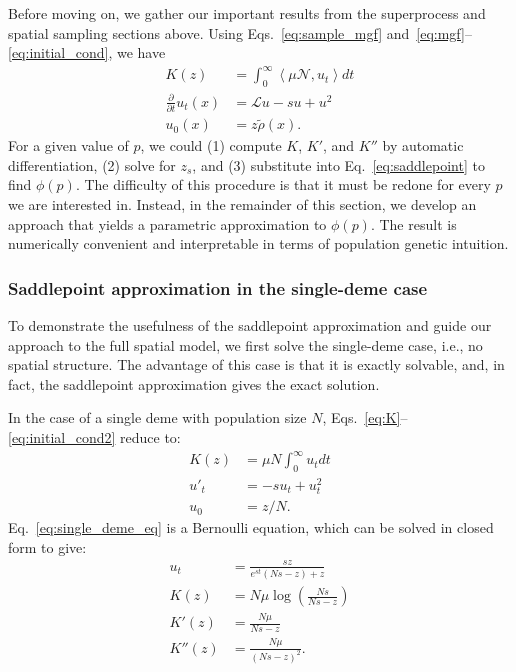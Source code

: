 \documentclass{article}
\begin{document}
Before moving on, we gather our important results from the superprocess and spatial sampling sections above.
Using Eqs.~\ref{eq:sample_mgf} and~\ref{eq:mgf}--\ref{eq:initial_cond}, we have
\begin{align}
    K(z) & = \int_0^\infty \left< \mu \mathcal{N}, u_t \right> dt \label{eq:k} \\
    \frac{\partial}{\partial t} u_t(x) & = \mathcal{L}u - su + u^2 \label{eq:pde2} \\
    u_0(x) & = z \tilde{\rho}(x). \label{eq:initial_cond2}
\end{align}
For a given value of $p$, we could (1) compute $K$, $K'$, and $K''$ by automatic differentiation, (2) solve for $z_s$, and (3) substitute into Eq.~\ref{eq:saddlepoint} to find $\phi(p)$.
The difficulty of this procedure is that it must be redone for every $p$ we are interested in.
Instead, in the remainder of this section, we develop an approach that yields a parametric approximation to $\phi(p)$.
The result is numerically convenient and interpretable in terms of population genetic intuition.

\subsubsection*{Saddlepoint approximation in the single-deme case}
To demonstrate the usefulness of the saddlepoint approximation and guide our approach to the full spatial model, we first solve the single-deme case, i.e., no spatial structure.
The advantage of this case is that it is exactly solvable, and, in fact, the saddlepoint approximation gives the exact solution.

In the case of a single deme with population size $N$, Eqs.~\ref{eq:K}--\ref{eq:initial_cond2} reduce to:
\begin{align}
    K(z) & = \mu N \int_0^\infty u_t dt \\
    u'_t& = -su_t + u_t^2 \label{eq:single_deme_eq} \\
    u_0 & = z/N.
\end{align}
Eq.~\ref{eq:single_deme_eq} is a Bernoulli equation, which can be solved in closed form to give:
\begin{align}
    u_t & = \frac{sz}{e^{st}(Ns-z) + z} \\
    K(z) & = N\mu \log \left( \frac{Ns}{Ns-z} \right) \label{eq:K_sd} \\
    K'(z) & = \frac{N\mu}{Ns-z} \label{eq:Kprime}\\
    K''(z) & = \frac{N\mu}{{(Ns-z)}^2}.
\end{align}
\end{document}
